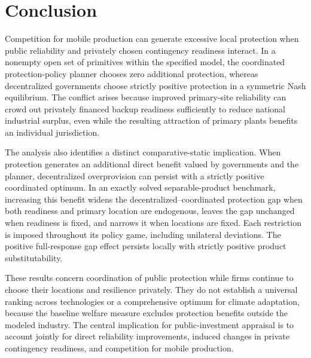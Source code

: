 \section{Conclusion}\label{sec:conclusion}

Competition for mobile production can generate excessive local protection when public reliability and privately chosen contingency readiness interact. In a nonempty open set of primitives within the specified model, the coordinated protection-policy planner chooses zero additional protection, whereas decentralized governments choose strictly positive protection in a symmetric Nash equilibrium. The conflict arises because improved primary-site reliability can crowd out privately financed backup readiness sufficiently to reduce national industrial surplus, even while the resulting attraction of primary plants benefits an individual jurisdiction.

The analysis also identifies a distinct comparative-static implication. When protection generates an additional direct benefit valued by governments and the planner, decentralized overprovision can persist with a strictly positive coordinated optimum. In an exactly solved separable-product benchmark, increasing this benefit widens the decentralized--coordinated protection gap when both readiness and primary location are endogenous, leaves the gap unchanged when readiness is fixed, and narrows it when locations are fixed. Each restriction is imposed throughout its policy game, including unilateral deviations. The positive full-response gap effect persists locally with strictly positive product substitutability.

These results concern coordination of public protection while firms continue to choose their locations and resilience privately. They do not establish a universal ranking across technologies or a comprehensive optimum for climate adaptation, because the baseline welfare measure excludes protection benefits outside the modeled industry. The central implication for public-investment appraisal is to account jointly for direct reliability improvements, induced changes in private contingency readiness, and competition for mobile production.
